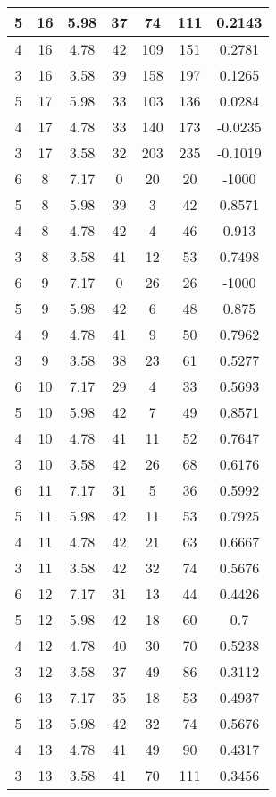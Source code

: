\documentclass[letterpaper, 12pt]{article}
\begin{document}
\begin{longtable}{|c|c|c|c|c|c|c|}
\hline
5 & 16 & 5.98 & 37 & 74 & 111 & 0.2143 \\
\hline
4 & 16 & 4.78 & 42 & 109 & 151 & 0.2781 \\
\hline
3 & 16 & 3.58 & 39 & 158 & 197 & 0.1265 \\
\hline
5 & 17 & 5.98 & 33 & 103 & 136 & 0.0284 \\
\hline
4 & 17 & 4.78 & 33 & 140 & 173 & -0.0235 \\
\hline
3 & 17 & 3.58 & 32 & 203 & 235 & -0.1019 \\
\hline
6 & 8 & 7.17 & 0 & 20 & 20 & -1000 \\
\hline
5 & 8 & 5.98 & 39 & 3 & 42 & 0.8571 \\
\hline
4 & 8 & 4.78 & 42 & 4 & 46 & 0.913 \\
\hline
3 & 8 & 3.58 & 41 & 12 & 53 & 0.7498 \\
\hline
6 & 9 & 7.17 & 0 & 26 & 26 & -1000 \\
\hline
5 & 9 & 5.98 & 42 & 6 & 48 & 0.875 \\
\hline
4 & 9 & 4.78 & 41 & 9 & 50 & 0.7962 \\
\hline
3 & 9 & 3.58 & 38 & 23 & 61 & 0.5277 \\
\hline
6 & 10 & 7.17 & 29 & 4 & 33 & 0.5693 \\
\hline
5 & 10 & 5.98 & 42 & 7 & 49 & 0.8571 \\
\hline
4 & 10 & 4.78 & 41 & 11 & 52 & 0.7647 \\
\hline
3 & 10 & 3.58 & 42 & 26 & 68 & 0.6176 \\
\hline
6 & 11 & 7.17 & 31 & 5 & 36 & 0.5992 \\
\hline
5 & 11 & 5.98 & 42 & 11 & 53 & 0.7925 \\
\hline
4 & 11 & 4.78 & 42 & 21 & 63 & 0.6667 \\
\hline
3 & 11 & 3.58 & 42 & 32 & 74 & 0.5676 \\
\hline
6 & 12 & 7.17 & 31 & 13 & 44 & 0.4426 \\
\hline
5 & 12 & 5.98 & 42 & 18 & 60 & 0.7 \\
\hline
4 & 12 & 4.78 & 40 & 30 & 70 & 0.5238 \\
\hline
3 & 12 & 3.58 & 37 & 49 & 86 & 0.3112 \\
\hline
6 & 13 & 7.17 & 35 & 18 & 53 & 0.4937 \\
\hline
5 & 13 & 5.98 & 42 & 32 & 74 & 0.5676 \\
\hline
4 & 13 & 4.78 & 41 & 49 & 90 & 0.4317 \\
\hline
3 & 13 & 3.58 & 41 & 70 & 111 & 0.3456 \\

\end{longtable}
\end{document}
